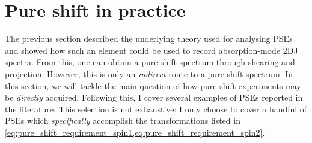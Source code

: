 \section{Pure shift in practice}
\label{sec:pureshift__intro_practice}

The previous section described the underlying theory used for analysing PSEs and showed how such an element could be used to record absorption-mode 2DJ spectra.
From this, one can obtain a pure shift spectrum through shearing and projection.
However, this is only an \textit{indirect} route to a pure shift spectrum.
In this section, we will tackle the main question of how pure shift experiments may be \textit{directly} acquired.
Following this, I cover several examples of PSEs reported in the literature.
This selection is not exhaustive: I only choose to cover a handful of PSEs which \textit{specifically} accomplish the transformations listed in \cref{eq:pure_shift_requirement_spin1,eq:pure_shift_requirement_spin2}.




